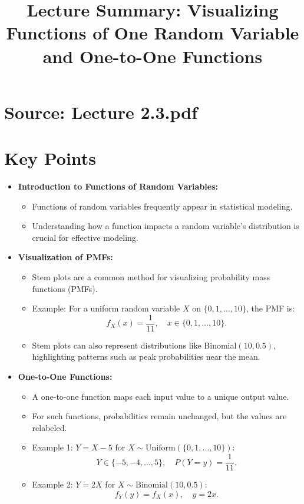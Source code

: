 \documentclass{article}
\title{Lecture Summary: Visualizing Functions of One Random Variable and One-to-One Functions}
\author{}
\date{}
\begin{document}
\maketitle

\section*{Source: Lecture 2.3.pdf}

\section*{Key Points}

\begin{itemize}
  \item \textbf{Introduction to Functions of Random Variables:}
    \begin{itemize}
      \item Functions of random variables frequently appear in statistical modeling.
      \item Understanding how a function impacts a random variable's distribution is crucial for effective modeling.
    \end{itemize}

  \item \textbf{Visualization of PMFs:}
    \begin{itemize}
      \item Stem plots are a common method for visualizing probability mass functions (PMFs).
      \item Example: For a uniform random variable $X$ on $\{0, 1, \dots, 10\}$, the PMF is:
        \[
          f_X(x) = \frac{1}{11}, \quad x \in \{0, 1, \dots, 10\}.
        \]
      \item Stem plots can also represent distributions like Binomial$(10, 0.5)$, highlighting patterns such as peak probabilities near the mean.
    \end{itemize}

  \item \textbf{One-to-One Functions:}
    \begin{itemize}
      \item A one-to-one function maps each input value to a unique output value.
      \item For such functions, probabilities remain unchanged, but the values are relabeled.
      \item Example 1: $Y = X - 5$ for $X \sim \text{Uniform}(\{0, 1, \dots, 10\})$:
        \[
          Y \in \{-5, -4, \dots, 5\}, \quad P(Y = y) = \frac{1}{11}.
        \]
      \item Example 2: $Y = 2X$ for $X \sim \text{Binomial}(10, 0.5)$:
        \[
          f_Y(y) = f_X(x), \quad y = 2x.
        \]
    \end{itemize}


\end{itemize}
\end{document}
